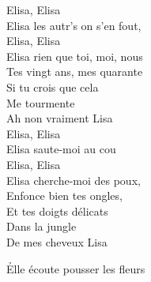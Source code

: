 \documentclass{novel}
\begin{document}
{\begin{minipage}[t][0.55\textheight][t]{\textwidth}
\begin{multicols}{2}
Elisa, Elisa \\
Elisa les autr's on s'en fout, \\
Elisa, Elisa \\
Elisa rien que toi, moi, nous \\
Tes vingt ans, mes quarante \\
Si tu crois que cela \\
Me tourmente \\
Ah non vraiment Lisa \\

Elisa, Elisa \\
Elisa saute-moi au cou \\
Elisa, Elisa \\
Elisa cherche-moi des poux, \\
Enfonce bien tes ongles, \\
Et tes doigts délicats \\
Dans la jungle \\
De mes cheveux Lisa \\
\end{multicols}
\end{minipage}
}

\newpage
\large

\h*{Elle écoute pousser les fleurs}
\end{document}
